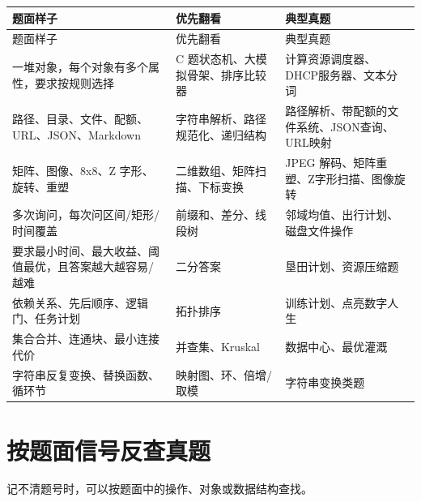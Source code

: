 \begin{longtable}{p{4.2cm}p{5.0cm}p{5.0cm}}
\toprule
题面样子 & 优先翻看 & 典型真题 \\
\midrule
\endfirsthead
\toprule
题面样子 & 优先翻看 & 典型真题 \\
\midrule
\endhead
一堆对象，每个对象有多个属性，要求按规则选择 & C 题状态机、大模拟骨架、排序比较器 & 计算资源调度器、DHCP服务器、文本分词 \\
路径、目录、文件、配额、URL、JSON、Markdown & 字符串解析、路径规范化、递归结构 & 路径解析、带配额的文件系统、JSON查询、URL映射 \\
矩阵、图像、8x8、Z 字形、旋转、重塑 & 二维数组、矩阵扫描、下标变换 & JPEG 解码、矩阵重塑、Z字形扫描、图像旋转 \\
多次询问，每次问区间/矩形/时间覆盖 & 前缀和、差分、线段树 & 邻域均值、出行计划、磁盘文件操作 \\
要求最小时间、最大收益、阈值最优，且答案越大越容易/越难 & 二分答案 & 垦田计划、资源压缩题 \\
依赖关系、先后顺序、逻辑门、任务计划 & 拓扑排序 & 训练计划、点亮数字人生 \\
集合合并、连通块、最小连接代价 & 并查集、Kruskal & 数据中心、最优灌溉 \\
字符串反复变换、替换函数、循环节 & 映射图、环、倍增/取模 & 字符串变换类题 \\
\bottomrule
\end{longtable}

\section{按题面信号反查真题}

记不清题号时，可以按题面中的操作、对象或数据结构查找。

